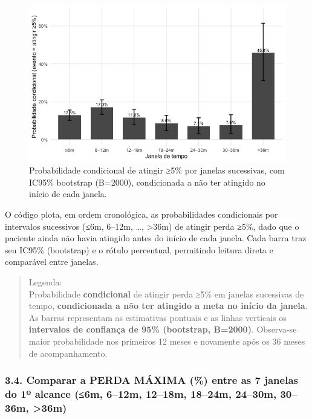 \documentclass[
]{article}
\begin{document}
\begin{figure}[H]

{\centering \includegraphics[width=1\textwidth,height=\textheight]{outputs/figs/plot-prob-cond-intervalos-ci-1.png}

}

\caption{Probabilidade condicional de atingir ≥5\% por janelas
sucessivas, com IC95\% bootstrap (B=2000), condicionada a não ter
atingido no início de cada janela.}

\end{figure}%

O código plota, em ordem cronológica, as probabilidades condicionais por
intervalos sucessivos (≤6m, 6--12m, \ldots, \textgreater36m) de atingir
perda ≥5\%, dado que o paciente ainda não havia atingido antes do início
de cada janela. Cada barra traz seu IC95\% (bootstrap) e o rótulo
percentual, permitindo leitura direta e comparável entre janelas.

\begin{quote}
Legenda:\\
Probabilidade \textbf{condicional} de atingir perda ≥5\% em janelas
sucessivas de tempo, \textbf{condicionada a não ter atingido a meta no
início da janela}. As barras representam as estimativas pontuais e as
linhas verticais os \textbf{intervalos de confiança de 95\% (bootstrap,
B=2000)}. Observa-se maior probabilidade nos primeiros 12 meses e
novamente após os 36 meses de acompanhamento.
\end{quote}

\subsubsection{3.4. Comparar a PERDA MÁXIMA (\%) entre as 7 janelas do
1º alcance (≤6m, 6--12m, 12--18m, 18--24m, 24--30m, 30--36m,
\textgreater36m)}\label{comparar-a-perda-muxe1xima-entre-as-7-janelas-do-1uxba-alcance-6m-612m-1218m-1824m-2430m-3036m-36m}
\end{document}
